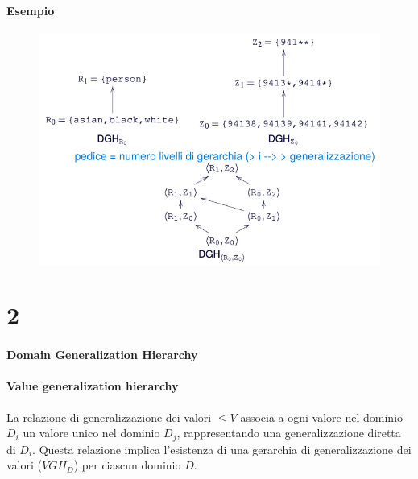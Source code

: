 \documentclass{report}
\begin{document}
\subsubsection{Esempio}
\begin{figure}[ht]
    \centering
    \includegraphics[width=1\linewidth]{images/domger.png}
\end{figure}
























\newpage

\chapter{2}



\subsubsection{Domain Generalization Hierarchy}





\subsubsection{Value generalization hierarchy}
La relazione di generalizzazione dei valori \( \leq V \) associa a ogni valore nel dominio \( D_i \) un valore unico nel dominio \( D_j \), rappresentando una generalizzazione diretta di \( D_i \). 
Questa relazione implica l'esistenza di una gerarchia di generalizzazione dei valori ($ VGH_{D} $) per ciascun dominio \( D \).
\end{document}
